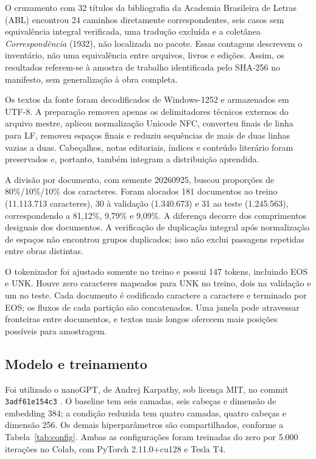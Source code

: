 \documentclass[conference]{IEEEtran}
\begin{document}
O cruzamento com 32 títulos da bibliografia da Academia Brasileira de Letras (ABL) \cite{ablBibliografia} encontrou 24 caminhos diretamente correspondentes, seis casos sem equivalência integral verificada, uma tradução excluída e a coletânea \textit{Correspondência} (1932), não localizada no pacote. Essas contagens descrevem o inventário, não uma equivalência entre arquivos, livros e edições. Assim, os resultados referem-se à amostra de trabalho identificada pelo SHA-256 no manifesto, sem generalização à obra completa.

Os textos da fonte foram decodificados de Windows-1252 e armazenados em UTF-8. A preparação removeu apenas os delimitadores técnicos externos do arquivo mestre, aplicou normalização Unicode NFC, converteu finais de linha para LF, removeu espaços finais e reduziu sequências de mais de duas linhas vazias a duas. Cabeçalhos, notas editoriais, índices e conteúdo literário foram preservados e, portanto, também integram a distribuição aprendida.

A divisão por documento, com semente 20260925, buscou proporções de 80\%/10\%/10\% dos caracteres. Foram alocados 181 documentos ao treino (11.113.713 caracteres), 30 à validação (1.340.673) e 31 ao teste (1.245.563), correspondendo a 81,12\%, 9,79\% e 9,09\%. A diferença decorre dos comprimentos desiguais dos documentos. A verificação de duplicação integral após normalização de espaços não encontrou grupos duplicados; isso não exclui passagens repetidas entre obras distintas.

O tokenizador foi ajustado somente no treino e possui 147 tokens, incluindo EOS e UNK. Houve zero caracteres mapeados para UNK no treino, dois na validação e um no teste. Cada documento é codificado caractere a caractere e terminado por EOS; os fluxos de cada partição são concatenados. Uma janela pode atravessar fronteiras entre documentos, e textos mais longos oferecem mais posições possíveis para amostragem.

\subsection{Modelo e treinamento}

Foi utilizado o nanoGPT, de Andrej Karpathy, sob licença MIT, no commit \texttt{3adf61e154c3} \cite{karpathyNanoGPT}. O baseline tem seis camadas, seis cabeças e dimensão de embedding 384; a condição reduzida tem quatro camadas, quatro cabeças e dimensão 256. Os demais hiperparâmetros são compartilhados, conforme a Tabela~\ref{tab:config}. Ambas as configurações foram treinadas do zero por 5.000 iterações no Colab, com PyTorch 2.11.0+cu128 e Tesla T4.
\end{document}
